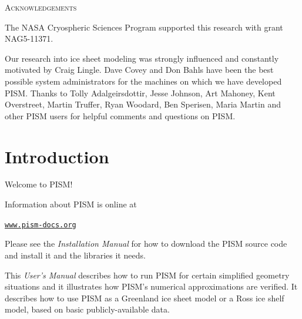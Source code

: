 \documentclass[11pt,final]{amsart}
\renewcommand{\t}[1]{\texttt{#1}}
\begin{document}
\centerline{\textsc{Acknowledgements}}
\bigskip

The NASA Cryospheric Sciences Program supported this research with grant NAG5-11371.

Our research into ice sheet modeling was strongly influenced and constantly motivated by Craig Lingle.  Dave Covey and Don Bahls have been the best possible system administrators for the machines on which we have developed PISM.  Thanks to Tolly Adalgeirsdottir, Jesse Johnson, Art Mahoney, Kent Overstreet, Martin Truffer, Ryan Woodard, Ben Sperisen, Maria Martin and other PISM users for helpful comments and questions on PISM.

\newpage
\setcounter{tocdepth}{2}
\tableofcontents


\newpage
\section{Introduction}\label{sect:intro}

Welcome to PISM!

Information about PISM is online at
\begin{center}
  \href{http://www.pism-docs.org}{\t{www.pism-docs.org}}
\end{center}

Please see the \emph{Installation Manual} for how to download the PISM source code and install it and the libraries it needs.

This \emph{User's Manual} describes how to run PISM for certain simplified geometry situations and it illustrates how PISM's numerical approximations are verified.  It describes how to use PISM as a Greenland ice sheet model or a Ross ice shelf model, based on basic publicly-available data.
\end{document}
